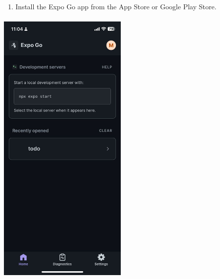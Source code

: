 \documentclass{article}
\begin{document}
\begin{enumerate}
    \item Install the Expo Go app from the App Store or Google Play Store.
\end{enumerate}
\includegraphics[width=2.49141in,height=5.53646in]{media/image4.jpg} 
\end{document}
